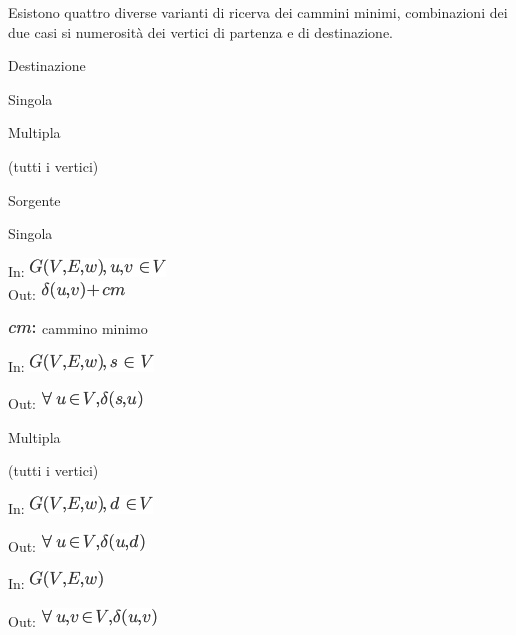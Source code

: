 \documentclass{article}
\begin{document}
{{{{Esistono quattro diverse varianti di ricerva dei cammini minimi, combinazioni dei due casi si numerosità dei vertici di partenza e di destinazione.}

\protect\hypertarget{t.249d86aca9d964d15cac3725f6a7ace85a3425b4}{}{}\protect\hypertarget{t.45}{}{}

{Destinazione}

{Singola}

{Multipla}

{(tutti i vertici)}

{Sorgente}

{Singola}

{In: }\includegraphics{images/image498.png}{\\
Out: }\includegraphics{images/image499.png}

\includegraphics{images/image500.png}{~cammino minimo}

{In: }\includegraphics{images/image501.png}

{Out: }\includegraphics{images/image502.png}

{Multipla}

{(tutti i vertici)}

{In: }\includegraphics{images/image503.png}

{Out: }\includegraphics{images/image504.png}

{In: }\includegraphics{images/image505.png}

{Out: }\includegraphics{images/image506.png}

}}}
\end{document}
